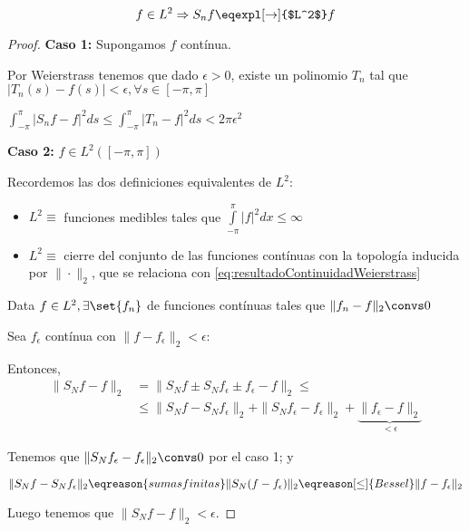 		\begin{theorem}

			\[ f \in L^2 \Rightarrow S_n f \eqexpl[\rightarrow]{$L^2$} f \]

		\end{theorem}

		\begin{proof}

			\textbf{Caso 1:} Supongamos $f$ contínua.

			Por Weierstrass tenemos que dado $\epsilon > 0$, existe un polinomio $T_n$ tal que $|T_n(s) - f(s)| < \epsilon, \forall s \in [-\pi,\pi]$

			\(
				\int^{\pi}_{-\pi} | S_n f - f |^2 ds \leq \int^\pi_{-\pi} | T_n - f |^2 ds < 2 \pi \epsilon^2 \label{eq:resultadoContinuidadWeierstrass}
			\)

			\textbf{Caso 2:} $f \in L^2 ([-\pi,\pi])$

			Recordemos las dos definiciones equivalentes de $L^2$:
			\begin{itemize}

				\item $L^2 \equiv$ funciones medibles tales que $\int\limits^\pi_{-\pi} |f|^2 dx \leq \infty $

				\item $L^2 \equiv$ cierre del conjunto de las funciones contínuas con la topología inducida por $\|\cdot\|_2$, que se relaciona con \ref{eq:resultadoContinuidadWeierstrass}

			\end{itemize}

			Data $f\in L^2, \exists \set{f_n}$ de funciones contínuas tales que $\|f_n - f\|_2 \convs 0$

			Sea $f_\epsilon$ contínua con $\|f-f_\epsilon\|_2 < \epsilon$:

			Entonces,
			\begin{align*}
			\| S_N f - f \|_2 &= \| S_N f \pm S_N f_\epsilon \pm f_\epsilon - f \|_2 \leq \\
			& \leq \| S_N f - S_N f_\epsilon \|_2 + \| S_N f_\epsilon - f_\epsilon \|_2 + \underbrace{\| f_\epsilon - f \|_2}_{< \epsilon}
			\end{align*}

			Tenemos que $\| S_N f_\epsilon - f_\epsilon \|_2 \convs 0$ por el caso 1; y

			\[ \| S_N f - S_N f_\epsilon \|_2 \eqreason{sumas finitas} \| S_N (f - f_\epsilon) \|_2 \eqreason[\leq]{Bessel} \| f - f_\epsilon \|_2 \]

			Luego tenemos que $\| S_N f - f \|_2 < \epsilon$.

		\end{proof}

